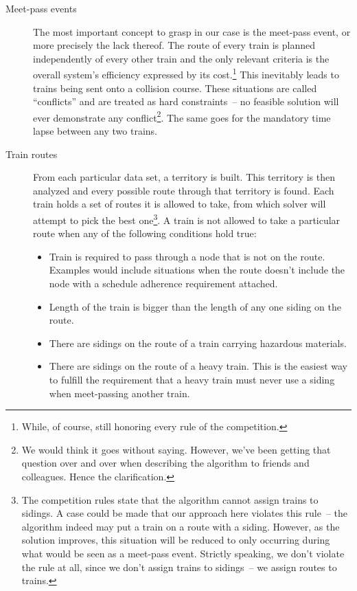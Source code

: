 \documentclass[10pt,a4paper,final]{article}
\begin{document}
\begin{description}

\item[Meet-pass events] The most important concept to grasp in our case is the meet-pass event, or more precisely the lack thereof. The route of every train is planned independently of every other train and the only relevant criteria is the overall system's efficiency expressed by its cost.\footnote{While, of course, still honoring every rule of the competition.} This inevitably leads to trains being sent onto a collision course. These situations are called ``conflicts'' and are treated as hard constraints~-- no feasible solution will ever demonstrate any conflict\footnote{We would think it goes without saying. However, we've been getting that question over and over when describing the algorithm to friends and colleagues. Hence the clarification.}. The same goes for the mandatory time lapse between any two trains.

\item[Train routes] From each particular data set, a territory is built. This territory is then analyzed and every possible route through that territory is found. Each train holds a set of routes it is allowed to take, from which solver will attempt to pick the best one\footnote{The competition rules state that the algorithm cannot assign trains to sidings. A case could be made that our approach here violates this rule~-- the algorithm indeed may put a train on a route with a siding. However, as the solution improves, this situation will be reduced to only occurring during what would be seen as a meet-pass event. Strictly speaking, we don't violate the rule at all, since we don't assign trains to sidings~-- we assign routes to trains.}. A train is not allowed to take a particular route when any of the following conditions hold true:

\begin{itemize}
\item Train is required to pass through a node that is not on the route. Examples would include situations when the route doesn't include the node with a schedule adherence requirement attached.
\item Length of the train is bigger than the length of any one siding on the route.
\item There are sidings on the route of a train carrying hazardous materials.
\item There are sidings on the route of a heavy train. This is the easiest way to fulfill the requirement that a heavy train must never use a siding when meet-passing another train.
\end{itemize}


\end{description}
\end{document}
